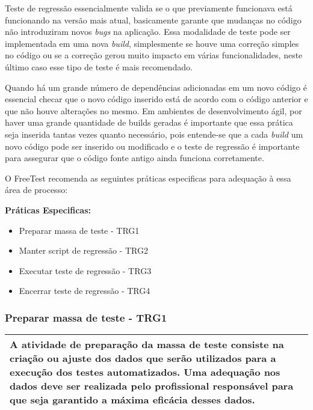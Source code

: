 Teste de regressão essencialmente valida se o que previamente funcionava está funcionando na versão mais atual, basicamente garante que mudanças no código não introduziram novos \textit{bugs} na aplicação. Essa modalidade de teste pode ser implementada em uma nova \textit{build}, simplesmente se houve uma correção simples no código ou se a correção gerou muito impacto em várias funcionalidades, neste último caso esse tipo de teste é mais recomendado.

Quando há um grande número de dependências adicionadas em um novo código é essencial checar que o novo código inserido está de acordo com o código anterior e que não houve alterações no mesmo. Em ambientes de desenvolvimento ágil, por haver uma grande quantidade de builds geradas é importante que essa prática seja inserida tantas vezes quanto necessário, pois entende-se que a cada \textit{build} um novo código pode ser inserido ou modificado e o teste de regressão é importante para assegurar que o código fonte antigo ainda funciona corretamente.

O FreeTest recomenda as seguintes práticas especificas para adequação à essa área de processo:

\textbf{Práticas Especificas:}

\begin{itemize}    
    \item Preparar massa de teste - TRG1
    \item Manter script de regressão - TRG2
    \item Executar teste de regressão - TRG3
    \item Encerrar teste de regressão - TRG4
\end{itemize}

\subsubsection{Preparar massa de teste - TRG1}
\label{sec:trg1}

\begin{table}[H]
\centering
\begin{tabular}{|p{130mm}|}
\hline
A atividade de preparação da massa de teste consiste na criação ou ajuste dos dados que serão utilizados para a execução dos testes automatizados. Uma adequação nos dados deve ser realizada pelo profissional responsável para que seja garantido a máxima eficácia desses dados. \\ 
\hline
\end{tabular}
\end{table}

